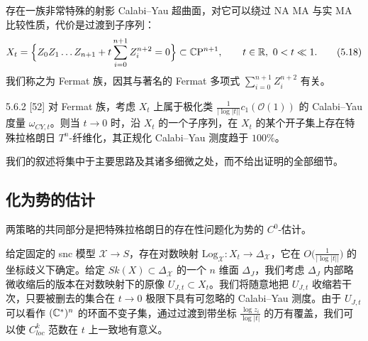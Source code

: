 
存在一族非常特殊的射影 Calabi--Yau 超曲面，对它可以绕过 NA MA 与实 MA 比较性质，代价是过渡到子序列：
\begin{equation}
X_t=\Big\{Z_0Z_1\dots Z_{n+1}+t\sum_{i=0}^{n+1}Z_i^{n+2}=0\Big\}\subset\mathbb{C}\mathrm{P}^{n+1},\qquad t\in\mathbb{R},\ 0<t\ll 1. \tag{5.18}
\end{equation}
我们称之为 Fermat 族，因其与著名的 Fermat 多项式 $\sum_{i=0}^{n+1}Z_i^{n+2}$ 有关。


\begin{theorem}{5.6.2}
[52] 对 Fermat 族，考虑 $X_t$ 上属于极化类 $\frac{1}{|\log|t||}c_1(\mathcal O(1))$ 的 Calabi--Yau 度量 $\omega_{CY,t}$。则当 $t\to 0$ 时，沿 $X_t$ 的一个子序列，在 $X_t$ 的某个开子集上存在特殊拉格朗日 $T^n$-纤维化，其正规化 Calabi--Yau 测度趋于 $100\%$。
\end{theorem}


我们的叙述将集中于主要思路及其诸多细微之处，而不给出证明的全部细节。

\subsection{化为势的估计}
两策略的共同部分是把特殊拉格朗日的存在性问题化为势的 $C^0$-估计。

给定固定的 snc 模型 $\mathcal X\to S$，存在对数映射 $\mathrm{Log}_{\mathcal X}:X_t\to\Delta_{\mathcal X}$，它在 $O\big(\frac{1}{|\log|t||}\big)$ 的坐标歧义下确定。给定 $Sk(X)\subset\Delta_{\mathcal X}$ 的一个 $n$ 维面 $\Delta_J$，我们考虑 $\Delta_J$ 内部略微收缩后的版本在对数映射下的原像 $U_{J,t}\subset X_t$。我们将随意地把 $U_{J,t}$ 收缩若干次，只要被删去的集合在 $t\to 0$ 极限下具有可忽略的 Calabi--Yau 测度。由于 $U_{J,t}$ 可以看作 $(\mathbb{C}^*)^n$ 的环面不变子集，通过过渡到带坐标 $\frac{\log z_i}{\log|t|}$ 的万有覆盖，我们可以使 $C^k_{loc}$ 范数在 $t$ 上一致地有意义。

